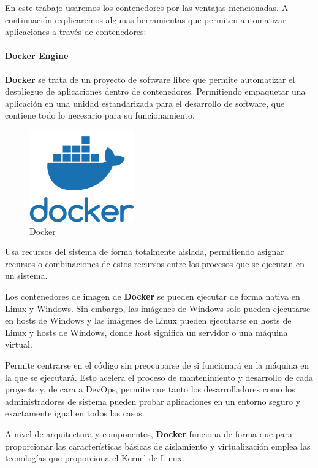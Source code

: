 En este trabajo usaremos los contenedores por las ventajas mencionadas. A continuación explicaremos algunas herramientas que permiten automatizar aplicaciones a través de contenedores: 
\paragraph{Docker Engine}
\textbf{Docker} \cite{docker} \cite{dockerCE} se trata de un proyecto de software libre que permite automatizar el despliegue de aplicaciones dentro de contenedores. Permitiendo empaquetar una aplicación en una unidad estandarizada para el desarrollo de software, que contiene todo lo necesario para su funcionamiento.
\begin{figure}[H]
	\centering
	\includegraphics[width=0.4\textwidth]{imagenes/entorno/docker.png}
	\caption{Docker} \label{docker}
\end{figure}

Usa recursos del sistema de forma totalmente aislada, permitiendo asignar recursos o combinaciones de estos recursos entre los procesos que se ejecutan en un sistema.

Los contenedores de imagen de \textbf{Docker} se pueden ejecutar de forma nativa en Linux y Windows. Sin embargo, las imágenes de Windows solo pueden ejecutarse en hosts de Windows y las imágenes de Linux pueden ejecutarse en hosts de Linux y hosts de Windows, donde host significa un servidor o una máquina virtual.

Permite centrarse en el código sin preocuparse de si funcionará en la máquina en la que se ejecutará. Esto acelera el proceso de mantenimiento y desarrollo de cada proyecto y, de cara a DevOps, permite que tanto los desarrolladores como los administradores de sistema pueden probar aplicaciones en un entorno seguro y exactamente igual en todos los casos.

A nivel de arquitectura y componentes, \textbf{Docker} funciona de forma que para proporcionar las características básicas de aislamiento y virtualización emplea las tecnologías que proporciona el Kernel de Linux.

